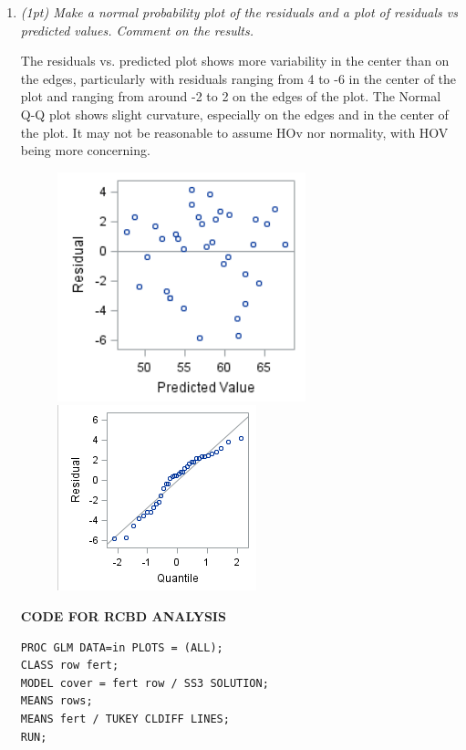 \documentclass{article}\usepackage[]{graphicx}\usepackage[]{color}
\begin{document}
\begin{enumerate}
\begin{enumerate}
\item 
{\it (1pt) Make a normal probability plot of the residuals and a plot of residuals vs predicted values. Comment on the results.}

The residuals vs. predicted plot shows more variability in the center than on the edges, particularly with residuals ranging from 4 to -6 in the center of the plot and ranging from around -2 to 2 on the edges of the plot. The Normal Q-Q plot shows slight curvature, especially on the edges and in the center of the plot. It may not be reasonable to assume HOv nor normality, with HOV being more concerning.

\begin{figure}
\centering
\begin{minipage}{.5\textwidth}
\includegraphics{prob1c}
\end{minipage}%
\begin{minipage}{.5\textwidth}
\centering
\includegraphics{rcbdQQ}
\end{minipage}
\end{figure}

{\bf CODE FOR RCBD ANALYSIS}

\begin{verbatim}
PROC GLM DATA=in PLOTS = (ALL);
CLASS row fert;
MODEL cover = fert row / SS3 SOLUTION;
MEANS rows;
MEANS fert / TUKEY CLDIFF LINES;
RUN;
\end{verbatim}


\end{enumerate}
\end{enumerate}
\end{document}
